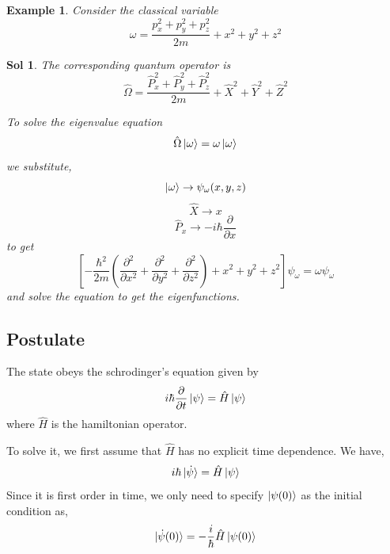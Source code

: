 \documentclass[12pt,a4paper]{report}
\newcommand{\rom}[1]{\Romannum{#1}}
\newcommand{\parder}[2]{\frac{\partial#1}{\partial#2}}
\newcommand{\nparder}[3]{\frac{\partial^#1#2}{\partial#3^#1}}
\newtheorem{example}{Example}[section]
\newtheorem*{solution}{Sol}
\begin{document}
\begin{example}
    Consider the classical variable
    \begin{equation*}
        \omega = \frac{p_x^2+p_y^2+p_z^2}{2m} + x^2+y^2+z^2
    \end{equation*}
\end{example}
\begin{solution}
    The corresponding quantum operator is
    \begin{equation*}
        \hat{\Omega} = \frac{\hat{P}_x^2+\hat{P}_y^2+\hat{P}_z^2}{2m} + \hat{X}^2+\hat{Y}^2+\hat{Z}^2
    \end{equation*}

    To solve the eigenvalue equation
    \begin{equation*}
        \hat{\Omega}\ket{\omega} = \omega\ket{\omega}
    \end{equation*}
    we substitute,
    \begin{equation*}
        \ket{\omega} \to \psi_\omega(x, y, z)
    \end{equation*}
    \begin{equation*}
        \hat{X} \to x
    \end{equation*}
    \begin{equation*}
        \hat{P}_x \to -i\hbar\parder{}{x}
    \end{equation*}
    to get
    \begin{equation*}
        \left[ -\frac{\hbar^2}{2m} \left( \nparder{2}{}{x} + \nparder{2}{}{y} + \nparder{2}{}{z} \right) + x^2 + y^2 + z^2 \right]\psi_\omega = \omega\psi_\omega
    \end{equation*}
    and solve the equation to get the eigenfunctions.
\end{solution}
\newpage
\subsection{Postulate \rom{4}}

The state obeys the schrodinger's equation given by
\begin{equation*}
    i\hbar\parder{}{t} \ket{\psi} = \hat{H}\ket{\psi}
\end{equation*}
where $\hat{H}$ is the hamiltonian operator.

To solve it, we first assume that $\hat{H}$ has no explicit time dependence. We have,
\begin{equation*}
    i\hbar\ket{\smash{\dot{\psi}}} = \hat{H}\ket{\psi}
\end{equation*}
Since it is first order in time, we only need to specify $\ket{\psi(0)}$ as the initial condition as,
\begin{equation*}
    \ket{\smash{\dot{\psi}}(0)} = -\frac{i}{\hbar} \hat{H}\ket{\psi(0)}
\end{equation*}
\end{document}
